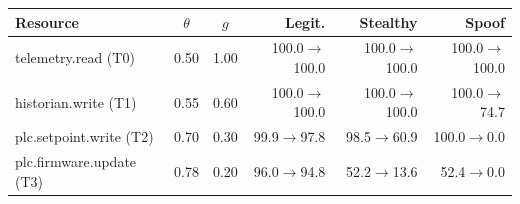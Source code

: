 \begin{tabular}{@{}lccrrr@{}}
\toprule
\textbf{Resource} & $\theta$ & $g$ & Legit. & Stealthy & Spoof \\
\midrule
telemetry.read (T0) & 0.50 & 1.00 & 100.0$\to$100.0 & 100.0$\to$100.0 & 100.0$\to$100.0 \\
historian.write (T1) & 0.55 & 0.60 & 100.0$\to$100.0 & 100.0$\to$100.0 & 100.0$\to$74.7 \\
plc.setpoint.write (T2) & 0.70 & 0.30 & 99.9$\to$97.8 & 98.5$\to$60.9 & 100.0$\to$0.0 \\
plc.firmware.update (T3) & 0.78 & 0.20 & 96.0$\to$94.8 & 52.2$\to$13.6 & 52.4$\to$0.0 \\
\bottomrule
\end{tabular}